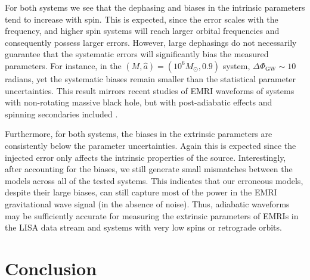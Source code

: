 \documentclass[%
 reprint,
 nofootinbib,
 amsmath,amssymb,
 aps,
 prd,
]{revtex4-2}
\begin{document}
For both systems we see that the dephasing and biases in the intrinsic parameters tend to increase with spin. This is expected, since the error scales with the frequency, and higher spin systems will reach larger orbital frequencies and consequently possess larger errors. However, large dephasings do not necessarily guarantee that the systematic errors will significantly bias the measured parameters. For instance, in the $(M, \hat{a})=(10^6 M_\odot, 0.9)$ system, $\Delta \Phi_\mathrm{GW} \sim 10$ radians, yet the systematic biases remain smaller than the statistical parameter uncertainties. This result mirrors recent studies of EMRI waveforms of systems with non-rotating massive black hole, but with post-adiabatic effects and spinning secondaries included \cite{BurkETC23}. 

Furthermore, for both systems, the biases in the extrinsic parameters are consistently below the parameter uncertainties. Again this is expected since the injected error only affects the intrinsic properties of the source. Interestingly, after accounting for the biases, we still generate small mismatches between the models across all of the tested systems. This indicates that our erroneous models, despite their large biases, can still capture most of the power in the EMRI gravitational wave signal (in the absence of noise). Thus, adiabatic waveforms may be sufficiently accurate for measuring the extrinsic parameters of EMRIs in the LISA data stream and systems with very low spins or retrograde orbits.  

\section{Conclusion}
\label{sec:conclusion}
\end{document}
